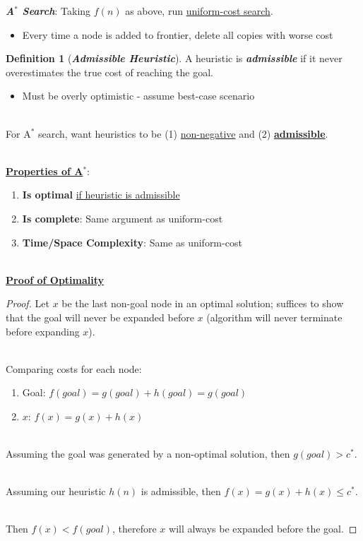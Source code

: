 \documentclass[12pt]{extarticle}
\theoremstyle{definition}
\newtheorem*{definition}{Definition}
\theoremstyle{remark}
\newcommand{\pstart}[0]{\noindent}
\newcommand{\newp}[0]{~\\ \pstart}
\newcommand{\term}[1]{\noindent\textbf{\textit{#1}}}
\newcommand{\titleul}[1]{\noindent \textbf{\ul{#1}}}
\begin{document}
\vspace{8pt}
\term{A$^\ast$ Search}: Taking $f(n)$ as above, run \ul{uniform-cost search}. \begin{itemize}
    \item Every time a node is added to frontier, delete all copies with worse cost
\end{itemize}

\begin{definition}[\term{Admissible Heuristic}] A heuristic is \term{admissible} if it never overestimates the true cost of reaching the goal. \begin{itemize}
    \item Must be overly optimistic - assume best-case scenario
\end{itemize}
\end{definition}

~\\ \pstart
For A$^\ast$ search, want heuristics to be (1) \ul{non-negative} and (2) \ul{\textbf{admissible}}.

~\\ \pstart
\titleul{Properties of A$^\ast$}: 
\begin{enumerate}
    \item \textbf{Is optimal} \ul{if heuristic is admissible}
    \item \textbf{Is complete}: Same argument as uniform-cost
    \item \textbf{Time/Space Complexity}: Same as uniform-cost
\end{enumerate}

\newp
\titleul{Proof of Optimality}
\begin{proof}
    Let $x$ be the last non-goal node in an optimal solution; suffices to show that the goal will never be expanded before $x$ (algorithm will never terminate before expanding $x$).
    
    \newp
    Comparing costs for each node: \begin{enumerate}
        \item Goal: $f(goal)=g(goal)+h(goal)=g(goal)$
        \item $x$: $f(x)=g(x)+h(x)$
    \end{enumerate}
    
    \newp 
    Assuming the goal was generated by a non-optimal solution, then $g(goal)>c^\ast$.
    
    \newp
    Assuming our heuristic $h(n)$ is admissible, then $f(x)=g(x)+h(x)\leq c^\ast$.
    
    \newp
    Then $f(x)<f(goal)$, therefore $x$ will always be expanded before the goal.
\end{proof}
\end{document}
